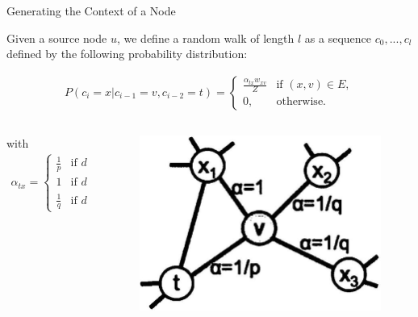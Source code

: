 \documentclass{beamer}
\begin{document}
	\begin{frame}[allowframebreaks]{Generating the Context of a Node}

		Given a source node $u$, we define a random walk of length $l$ as a sequence $c_0, ..., c_l$ defined by the following probability distribution:
		
		\begin{align*}
		P(c_i = x | c_{i-1} = v, c_{i-2}=t) = 
		\begin{cases}
		\frac{\alpha_{tx} w_{xv}}{Z} &\text{if } (x, v) \in E, \\
		0, &\text{otherwise.}
		\end{cases}
		\end{align*}
		
		\begin{columns}
			\begin{column}{0.45\textwidth}

				with 
				\begin{align*}
				\alpha_{tx} = 
				\begin{cases}
				\frac{1}{p} & \text{if } d(t, x) = 0,\\
				1 & \text{if } d(t, x) = 1,\\
				\frac{1}{q} & \text{if } d(t, x) = 2.
				\end{cases}
				\end{align*}
			\end{column}
			
			\begin{column}{0.45\textwidth}
				\begin{figure}
					\centering
					\includegraphics[width=\textwidth]{presentation_5_figures/random_walk}
				\end{figure}
			\end{column}
		\end{columns}
		

\end{frame}
\end{document}
